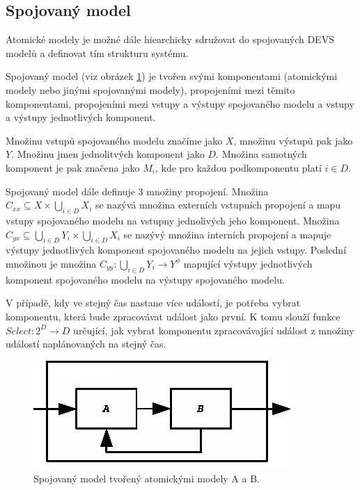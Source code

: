 \subsection{Spojovaný model}

Atomické modely je možné dále hiearchicky sdružovat do spojovaných DEVS modelů a definovat tím strukturu systému.

Spojovaný model (viz obrázek \ref{fig:coupled}) je tvořen svými komponentami (atomickými modely nebo jinými spojovanými modely), propojeními mezi těmito komponentami, propojeními mezi vstupy a výstupy spojovaného modelu a vstupy a výstupy jednotlivých komponent. 

Množinu vstupů spojovaného modelu značíme jako $X$, množinu výstupů pak jako $Y$. Množinu jmen jednolitvých komponent jako $D$. Množina samotných komponent je pak značena jako $M_i$, kde pro každou podkomponentu platí $i \in D$.

Spojovaný model dále definuje 3 množiny propojení. Množina $C_{xx}\subseteq X \times \bigcup_{i \in D} X_i$ se nazývá množina externích vstupních propojení a mapu vstupy spojovaného modelu na vstupny jednolivých jeho komponent. Množina $C_{yx}\subseteq \bigcup_{i \in D} Y_i \times \bigcup_{i \in D} X_i$ se nazývý množina interních propojení a mapuje výstupy jednotlivých komponent spojovaného modelu na jejich vstupy. Poslední množinou je množina $C_{yy}: \bigcup_{i \in D} Y_i \rightarrow Y^\phi$ mapující výstupy jednotlivých komponent spojovaného modelu na výstupy spojovaného modelu.

V případě, kdy ve stejný čas nastane více událostí, je potřeba vybrat komponentu, která bude zpracovávat událost jako první. K tomu slouží funkce $Select:2^D \rightarrow D$ určující, jak vybrat komponentu zpracovávající událost z množiny událostí naplánovaných na stejný čas.

\begin{figure}[ht]
\centering
\includegraphics[trim=0cm 0cm 0cm 0cm, scale=0.7]{fig/coupled}
\caption{Spojovaný model tvořený atomickými modely A a B.}
\label{fig:coupled}
\end{figure}

